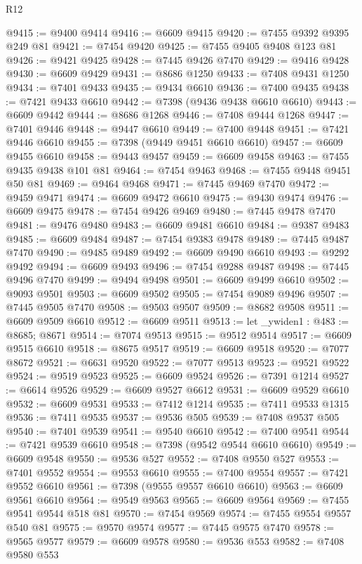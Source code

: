 \begin{lexlean}{R12}
\begin{coremodule}
{{{{{{{{{{{{{{{{{{{{{{{{{{{{{{{{{{{{{{{{{{{{{{{{{{{{{{{{{{{{{{{{{{{{{{{{{{{{{{{{{{@9415 := @9400 @9414
@9416 := @6609 @9415
@9420 := @7455 @9392 @9395 @249 @81
@9421 := @7454 @9420
@9425 := @7455 @9405 @9408 @123 @81
@9426 := @9421 @9425
@9428 := @7445 @9426 @7470
@9429 := @9416 @9428
@9430 := @6609 @9429
@9431 := @8686 @1250
@9433 := @7408 @9431 @1250
@9434 := @7401 @9433
@9435 := @9434 @6610
@9436 := @7400 @9435
@9438 := @7421 @9433 @6610
@9442 := @7398 (@9436 @9438 @6610 @6610)
@9443 := @6609 @9442
@9444 := @8686 @1268
@9446 := @7408 @9444 @1268
@9447 := @7401 @9446
@9448 := @9447 @6610
@9449 := @7400 @9448
@9451 := @7421 @9446 @6610
@9455 := @7398 (@9449 @9451 @6610 @6610)
@9457 := @6609 @9455 @6610
@9458 := @9443 @9457
@9459 := @6609 @9458
@9463 := @7455 @9435 @9438 @101 @81
@9464 := @7454 @9463
@9468 := @7455 @9448 @9451 @50 @81
@9469 := @9464 @9468
@9471 := @7445 @9469 @7470
@9472 := @9459 @9471
@9474 := @6609 @9472 @6610
@9475 := @9430 @9474
@9476 := @6609 @9475
@9478 := @7454 @9426 @9469
@9480 := @7445 @9478 @7470
@9481 := @9476 @9480
@9483 := @6609 @9481 @6610
@9484 := @9387 @9483
@9485 := @6609 @9484
@9487 := @7454 @9383 @9478
@9489 := @7445 @9487 @7470
@9490 := @9485 @9489
@9492 := @6609 @9490 @6610
@9493 := @9292 @9492
@9494 := @6609 @9493
@9496 := @7454 @9288 @9487
@9498 := @7445 @9496 @7470
@9499 := @9494 @9498
@9501 := @6609 @9499 @6610
@9502 := @9093 @9501
@9503 := @6609 @9502
@9505 := @7454 @9089 @9496
@9507 := @7445 @9505 @7470
@9508 := @9503 @9507
@9509 := @8682 @9508
@9511 := @6609 @9509 @6610
@9512 := @6609 @9511
@9513 := let _ywiden1 : @483 := @8685; @8671
@9514 := @7074 @9513
@9515 := @9512 @9514
@9517 := @6609 @9515 @6610
@9518 := @8675 @9517
@9519 := @6609 @9518
@9520 := @7077 @8672
@9521 := @6631 @9520
@9522 := @7077 @9513
@9523 := @9521 @9522
@9524 := @9519 @9523
@9525 := @6609 @9524
@9526 := @7391 @1214
@9527 := @6614 @9526
@9529 := @6609 @9527 @6612
@9531 := @6609 @9529 @6610
@9532 := @6609 @9531
@9533 := @7412 @1214
@9535 := @7411 @9533 @1315
@9536 := @7411 @9535
@9537 := @9536 @505
@9539 := @7408 @9537 @505
@9540 := @7401 @9539
@9541 := @9540 @6610
@9542 := @7400 @9541
@9544 := @7421 @9539 @6610
@9548 := @7398 (@9542 @9544 @6610 @6610)
@9549 := @6609 @9548
@9550 := @9536 @527
@9552 := @7408 @9550 @527
@9553 := @7401 @9552
@9554 := @9553 @6610
@9555 := @7400 @9554
@9557 := @7421 @9552 @6610
@9561 := @7398 (@9555 @9557 @6610 @6610)
@9563 := @6609 @9561 @6610
@9564 := @9549 @9563
@9565 := @6609 @9564
@9569 := @7455 @9541 @9544 @518 @81
@9570 := @7454 @9569
@9574 := @7455 @9554 @9557 @540 @81
@9575 := @9570 @9574
@9577 := @7445 @9575 @7470
@9578 := @9565 @9577
@9579 := @6609 @9578
@9580 := @9536 @553
@9582 := @7408 @9580 @553
}}}}}}}}}}}}}}}}}}}}}}}}}}}}}}}}}}}}}}}}}}}}}}}}}}}}}}}}}}}}}}}}}}}}}}}}}}}}}}}}}}
\end{coremodule}
\end{lexlean}
